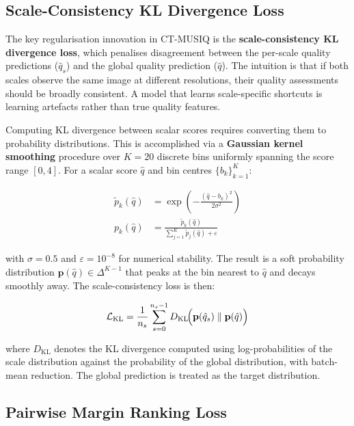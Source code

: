 \subsection{Scale-Consistency KL Divergence Loss}

The key regularisation innovation in CT-MUSIQ is the \textbf{scale-consistency KL
divergence loss}, which penalises disagreement between the per-scale quality predictions
($\hat{q}_s$) and the global quality prediction ($\hat{q}$). The intuition is that if
both scales observe the same image at different resolutions, their quality assessments
should be broadly consistent. A model that learns scale-specific shortcuts is learning
artefacts rather than true quality features.

Computing KL divergence between scalar scores requires converting them to probability
distributions. This is accomplished via a \textbf{Gaussian kernel smoothing} procedure
over $K = 20$ discrete bins uniformly spanning the score range $[0, 4]$. For a scalar
score $\hat{q}$ and bin centres $\{b_k\}_{k=1}^{K}$:

\begin{align}
    \tilde{p}_k(\hat{q}) &= \exp\!\left(-\frac{(\hat{q} - b_k)^2}{2\sigma^2}\right) \\
    p_k(\hat{q})          &= \frac{\tilde{p}_k(\hat{q})}{\displaystyle\sum_{j=1}^{K}
                             \tilde{p}_j(\hat{q}) + \varepsilon}
\end{align}

with $\sigma = 0.5$ and $\varepsilon = 10^{-8}$ for numerical stability. The result is a
soft probability distribution $\mathbf{p}(\hat{q}) \in \Delta^{K-1}$ that peaks at the
bin nearest to $\hat{q}$ and decays smoothly away. The scale-consistency loss is then:

\begin{equation}
    \mathcal{L}_{\text{KL}} = \frac{1}{n_s} \sum_{s=0}^{n_s - 1}
    D_{\text{KL}}\!\Bigl(\mathbf{p}(\hat{q}_s) \;\|\; \mathbf{p}(\hat{q})\Bigr)
\end{equation}

where $D_{\text{KL}}$ denotes the KL divergence computed using log-probabilities of the
scale distribution against the probability of the global distribution, with batch-mean
reduction. The global prediction is treated as the target distribution.

\subsection{Pairwise Margin Ranking Loss}

